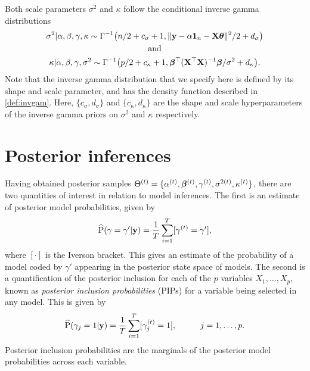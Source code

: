 \documentclass[11pt,twoside,openright]{report}
\begin{document}
Both scale parameters $\sigma^2$ and $\kappa$ follow the conditional inverse gamma distributions
\begin{align*}
  \begin{gathered}
    \sigma^2|\alpha,\beta,\gamma,\kappa \sim \Gamma^{-1}\big(n/2+c_\sigma+1, \Vert {\mathbf y}-\alpha{\mathbf 1}_n-{\mathbf X}{\bm\theta} \Vert^2/2 + d_\sigma \big) \\
    \text{and} \\
    \kappa|\alpha,\beta,\gamma,\sigma^2 \sim \Gamma^{-1}\big(p/2+c_\kappa+1, {\bm\beta}^\top(\mathbf X^\top \mathbf X)^{-1}{\bm\beta}/\sigma^2 + d_\kappa \big). \\
  \end{gathered}
\end{align*}
Note that the inverse gamma distribution that we specify here is defined by its shape and scale parameter, and has the density function described in \cref{def:invgam}.
Here, $\{c_\sigma, d_\sigma\}$ and $\{c_\kappa, d_\kappa\}$ are the shape and scale hyperparameters of the inverse gamma priors on $\sigma^2$ and $\kappa$ respectively.


\section{Posterior inferences}

Having obtained posterior samples $\Theta^{(t)}=\{\alpha^{(t)},{\bm\beta}^{(t)},\gamma^{(t)},\sigma^{2(t)},\kappa^{(t)} \}$, there are two quantities of interest in relation to model inferences. 
The first is an estimate of posterior model probabilities, given by
\begin{align}\label{eq:pmp-prop}
  \widehat {\operatorname{P}}(\gamma = \gamma' | {\mathbf y}) = \frac{1}{T}\sum_{i=1}^T [\gamma^{(t)} = \gamma'],
\end{align}
where $[\cdot]$ is the Iverson bracket.
This gives an estimate of the probability of a model coded by $\gamma'$ appearing in the posterior state space of models.
The second is a quantification of the posterior inclusion for each of the $p$ variables $X_1,\dots,X_p$, known as \emph{posterior inclusion probabilities} (PIPs) for a variable being selected in any model.
This is given by
\begin{align}\label{eq:pip-prop}
  \widehat {\operatorname{P}}(\gamma_j = 1 | {\mathbf y}) = \frac{1}{T}\sum_{i=1}^T [\gamma_j^{(t)} = 1], \hspace{1cm} j=1,\dots,p.
\end{align}
Posterior inclusion probabilities are the marginals of the posterior model probabilities across each variable.
\end{document}
